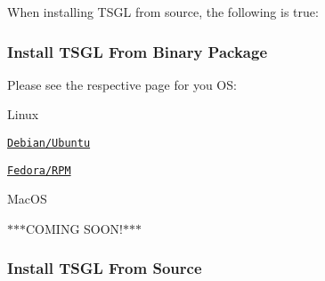 When installing T\-S\-G\-L from source, the following is true\-:

\subsubsection*{Install T\-S\-G\-L From Binary Package}

Please see the respective page for you O\-S\-:


\begin{DoxyItemize}
\item Linux
\begin{DoxyItemize}
\item \href{https://github.com/Calvin-CS/TSGL/wiki/Debian-%28Aptitude%29}{\tt Debian/\-Ubuntu}
\item \href{https://github.com/Calvin-CS/TSGL/wiki/RPM}{\tt Fedora/\-R\-P\-M}
\end{DoxyItemize}
\item Mac\-O\-S
\begin{DoxyItemize}
\item $\ast$$\ast$$\ast$\-C\-O\-M\-I\-N\-G S\-O\-O\-N!$\ast$$\ast$$\ast$
\end{DoxyItemize}
\end{DoxyItemize}

\subsubsection*{Install T\-S\-G\-L From Source}